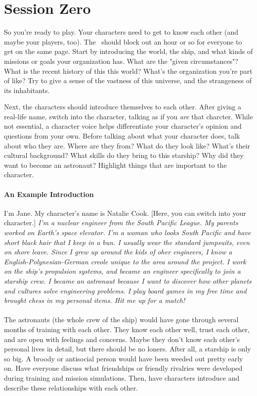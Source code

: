 \section{Session Zero}
\par
So you're ready to play. Your characters need to get to know each other (and maybe your players, too). The \gm\, should block out an hour or so for everyone to get on the same page. Start by introducing the world, the ship, and what kinds of missions or goals your organization has. What are the "given circumstances"? What is the recent history of this this world? What's the organization you're part of like? Try to give a sense of the vastness of this universe, and the strangeness of its inhabitants.

\par
Next, the characters should introduce themselves to each other. After giving a real-life name, switch into the character, talking as if you \textit{are} that charcter. While not essential, a character voice helps differentiate your character's opinion and questions from your own. Before talking about what your character does, talk about who they are. Where are they from? What do they look like? What's their cultural background? What skills do they bring to this starship? Why did they want to become an astronaut? Highlight things that are important to the character.

\paragraph{An Example Introduction}
I'm Jane. My character's name is Natalie Cook. [Here, you can switch into your character.] \textit{I'm a nuclear engineer from the South Pacific League. My parents worked on Earth's space elevator. I'm a woman who looks South Pacific and have short black hair that I keep in a bun. I usually wear the standard jumpsuits, even on shore leave. Since I grew up around the kids of oher engineers, I know a English-Polynesian-German creole unique to the area around the project. I work on the ship's propulsion systems, and became an engineer specifically to join a starship crew. I became an astronaut because I want to discover how other planets and cultures solve engineering problems. I play board games in my free time and brought chess in my personal items. Hit me up for a match!}

\paragraph{}
The astronauts (the whole crew of the ship) would have gone through several months of training with each other. They know each other well, trust each other, and are open with feelings and concerns. Maybe they don't know each other's personal lives in detail, but there should be no loners. After all, a starship is only so big. A broody or antisocial person would have been weeded out pretty early on. Have everyone discuss what friendships or friendly rivalries were developed during training and mission simulations. Then, have characters introduce and describe these relationships with each other.

